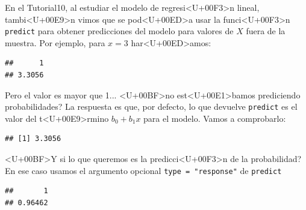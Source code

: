 \documentclass[10pt,a4paper]{article}
\begin{document}
En el Tutorial10, al estudiar el modelo de regresi<U+00F3>n lineal, tambi<U+00E9>n vimos que se pod<U+00ED>a usar la funci<U+00F3>n {\tt predict} para obtener predicciones del modelo para valores
de $X$ fuera de la muestra. Por ejemplo, para $x=3$ har<U+00ED>amos:

\begin{knitrout}
\color{fgcolor}\begin{kframe}
\begin{alltt}
 \hlkwb{=} 
  \hlstd{=} \hlstd{(}
\end{alltt}
\begin{verbatim}
##      1 
## 3.3056
\end{verbatim}
\end{kframe}
\end{knitrout}

Pero el valor es mayor que 1... <U+00BF>no est<U+00E1>bamos prediciendo probabilidades? La respuesta es que, por defecto, lo que devuelve {\tt predict} es el valor del t<U+00E9>rmino $b_0 + b_1 x$ para el modelo. Vamos a comprobarlo:

\begin{knitrout}
\color{fgcolor}\begin{kframe}
\begin{alltt}
 \hlopt{+}  \hlopt{*} 
\end{alltt}
\begin{verbatim}
## [1] 3.3056
\end{verbatim}
\end{kframe}
\end{knitrout}

<U+00BF>Y si lo que queremos es la predicci<U+00F3>n de la probabilidad? En ese caso usamos el argumento opcional \verb#type = "response"# de {\tt predict}

\begin{knitrout}
\color{fgcolor}\begin{kframe}
\begin{alltt}
  \hlstd{=} \hlstd{(}  \hlstd{=} \hlstd{)}
\end{alltt}
\begin{verbatim}
##       1 
## 0.96462
\end{verbatim}
\end{kframe}
\end{knitrout}
\end{document}

